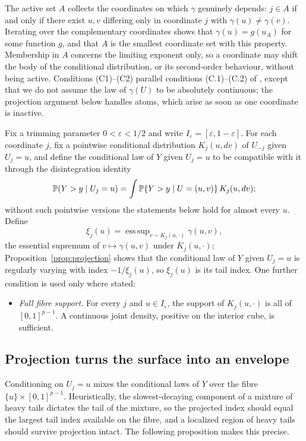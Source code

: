 \documentclass[bj,authoryear]{imsart}
\theoremstyle{plain}
\DeclareMathOperator*{\esssup}{ess\,sup}
\newcommand{\A}{A}\newcommand{\I}{I_\varepsilon}
\begin{document}
The active set $\A$ collects the coordinates on which $\gamma$
genuinely depends: $j\in\A$ if and only if there exist $u,v$ differing
only in coordinate $j$ with $\gamma(u)\ne\gamma(v)$. Iterating over the
complementary coordinates shows that $\gamma(u)=g(u_{\A})$ for some
function $g$, and that $\A$ is the smallest coordinate set with this
property. Membership in $\A$ concerns the limiting exponent
only, so a coordinate may shift the body of the conditional distribution, or
its second-order behaviour, without being active. Conditions (C1)--(C2)
parallel conditions (C.1)--(C.2) of \citet{gardesPodgorny2025}, except that
we do not assume the law of $\gamma(U)$ to be absolutely continuous; the
projection argument below handles atoms, which arise as soon as one
coordinate is inactive.

Fix a trimming parameter $0<\varepsilon<1/2$ and write
$\I=[\varepsilon,1-\varepsilon]$. For each coordinate $j$, fix a
pointwise conditional distribution $K_j(u,dv)$ of $U_{-j}$ given
$U_j=u$, and define the conditional law of $Y$ given $U_j=u$ to be
compatible with it through the disintegration identity
\[
 \mathbb P(Y>y\mid U_j=u)=\int\mathbb P\{Y>y\mid U=(u,v)\}\,K_j(u,dv);
\]
without such pointwise versions the statements below hold for almost
every $u$. Define
\[
 \xi_j(u)=\esssup\nolimits_{v\sim K_j(u,\cdot)}\gamma(u,v),
\]
the essential supremum of $v\mapsto\gamma(u,v)$ under $K_j(u,\cdot)$;
Proposition~\ref{prop:projection} shows that the conditional law of $Y$
given $U_j=u$ is regularly varying with index $-1/\xi_j(u)$, so
$\xi_j(u)$ is its tail index. One further condition is used only where
stated:

\begin{itemize}
\item[(S)] \emph{Full fibre support.} For every $j$ and $u\in\I$, the
support of $K_j(u,\cdot)$ is all of $[0,1]^{p-1}$. A continuous joint
density, positive on the interior cube, is sufficient.
\end{itemize}

\subsection{Projection turns the surface into an envelope}

Conditioning on $U_j=u$ mixes the conditional laws of $Y$ over the
fibre $\{u\}\times[0,1]^{p-1}$. Heuristically, the slowest-decaying
component of a mixture of heavy tails dictates the tail of the mixture,
so the projected index should equal the largest tail index available on
the fibre, and a localized region of heavy tails should survive
projection intact. The following proposition makes this precise.
\end{document}
